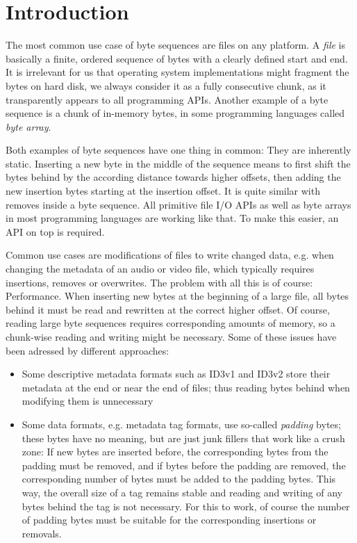 \documentclass[english, 10pt, openright, twocolumn, landscape, twoside, notitlepage, a4paper, pdftex]		
{article}
\begin{document}
\section{Introduction}%
\label{sec:Introduction}%

The most common use case of byte sequences are files on any platform. A \emph{file} is basically a finite, ordered sequence of bytes with a clearly defined start and end. It is irrelevant for us that operating system implementations might fragment the bytes on hard disk, we always consider it as a fully consecutive chunk, as it transparently appears to all programming APIs. Another example of a byte sequence is a chunk of in-memory bytes, in some programming languages called \emph{byte array}.

Both examples of byte sequences have one thing in common: They are inherently static. Inserting a new byte in the middle of the sequence means to first shift the bytes behind by the according distance towards higher offsets, then adding the new insertion bytes starting at the insertion offset. It is quite similar with removes inside a byte sequence. All primitive file I/O APIs as well as byte arrays in most programming languages are working like that. To make this easier, an API on top is required.

Common use cases are modifications of files to write changed data, e.g. when changing the metadata of an audio or video file, which typically requires insertions, removes or overwrites. The problem with all this is of course: Performance. When inserting new bytes at the beginning of a large file, all bytes behind it must be read and rewritten at the correct higher offset. Of course, reading large byte sequences requires corresponding amounts of memory, so a chunk-wise reading and writing might be necessary. Some of these issues have been adressed by different approaches:
\begin{itemize}
\item Some descriptive metadata formats such as ID3v1 and ID3v2 store their metadata at the end or near the end of files; thus reading bytes behind when modifying them is unnecessary
\item Some data formats, e.g. metadata tag formats, use so-called \emph{padding} bytes; these bytes have no meaning, but are just junk fillers that work like a crush zone: If new bytes are inserted before, the corresponding bytes from the padding must be removed, and if bytes before the padding are removed, the corresponding number of bytes must be added to the padding bytes. This way, the overall size of a tag remains stable and reading and writing of any bytes behind the tag is not necessary. For this to work, of course the number of padding bytes must be suitable for the corresponding insertions or removals.
\end{itemize}
\end{document}

